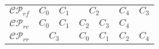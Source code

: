 \begin{tabular}{c|c|c|c|c|}
	\cline{2-5}
	$\mathcal{C}\mathcal{P}_{rf}$ & $C_{0} \quad C_{1}$ & $C_{2}$ & $C_{4}$ & $C_{3}$ \\
	\cline{2-5}
	$\mathcal{C}\mathcal{P}_{rc}$ & $C_{0} \quad C_{1}$ & $C_{2} \quad C_{3}$ & $C_{4}$ \\
	\cline{2-5}
	$\mathcal{C}\mathcal{P}_{rr}$ & $C_{3}$ & $C_{0} \quad C_{1}$ & $C_{2}$ & $C_{4}$ \\
	\cline{2-5}
\end{tabular}

